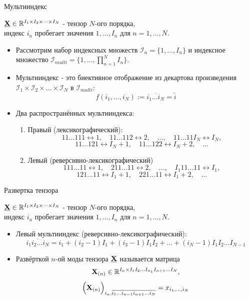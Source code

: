 
\begin{frame}{Мультииндекс}

$\underline{\textbf{X}} \in \mathbb{R}^{I_1 \times I_2 \times \dots \times I_N}$ - тензор $N$-ого порядка, \\
индекс $i_n$ пробегает значения $1, \dots, I_n$ для $n = 1, \dots, N$.
\vspace{0.3cm}
\begin{itemize}
    \item Рассмотрим набор индексных множеств $\mathcal{I}_n = \{1, \dots, I_n\}$ и индексное множество $\mathcal{I}_{multi} = \{1, \dots, \prod_{n=1}^N I_n\}$.
    \item Мультииндекс - это биективное отображение из декартова произведения $\mathcal{I}_1 \times \mathcal{I}_2 \times \dots \times \mathcal{I}_N$ в $\mathcal{I}_{multi}$: $$f(i_1, ..., i_N) := \overline{i_1...i_N} = \hat{i}$$
    \item Два распространённых мультииндекса:
    \begin{enumerate}
        \item Правый (лексикографический): 
        $$11...111 \leftrightarrow 1, \quad 11...112 \leftrightarrow 2, \quad  \dots, \quad 11...11I_N \leftrightarrow I_N, $$ 
        $$ 11...121 \leftrightarrow I_N + 1, \quad 11...122 \leftrightarrow I_N + 2, \quad \dots$$
        \item Левый (реверсивно-лексикографический)
        $$111...11 \leftrightarrow 1, \quad 211...11 \leftrightarrow 2, \quad  \dots, \quad I_1 11...11 \leftrightarrow I_1, $$ 
        $$ 121...11 \leftrightarrow I_1 + 1, \quad 221...11 \leftrightarrow I_1 + 2, \quad \dots$$
    \end{enumerate}



\end{itemize}

\end{frame}

\begin{frame}{Развертка тензора}

$\underline{\textbf{X}} \in \mathbb{R}^{I_1 \times I_2 \times \dots \times I_N}$ - тензор $N$-ого порядка, \\
индекс $i_n$ пробегает значения $1, \dots, I_n$ для $n = 1, \dots, N$.
\vspace{0.5cm}
\begin{itemize}
    \item Левый мультииндекс (реверсивно-лексикографический):
    $$ \overline{i_1 i_2 \dots i_N} = i_1 + (i_2 - 1)I_1 + (i_3 - 1)I_1 I_2 + \dots + (i_N - 1)I_1 I_2 \dots I_{N-1}$$
    \item Развёрткой $n$-ой моды тензора $\underline{\textbf{X}}$ называется матрица $$\textbf{X}_{(n)} \in \mathbb{R}^{I_n \times I_1 I_2 \dots I_{n_1} I_{n+1} \dots I_N},$$  
    $$\Big(\textbf{X}_{(n)}\Big)_{i_n, \overline{i_1 \dots i_{n-1} i_{n+1} \dots i_N}} = x_{i_1, \dots, i_N}$$

\end{itemize}

\end{frame}


